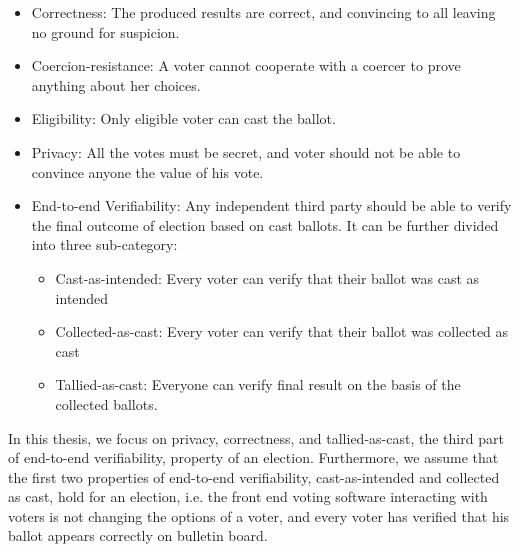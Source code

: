 %   
 \begin{itemize}
 
  \item Correctness:
 	The produced results are correct, and convincing to all leaving no  ground for suspicion. 

 \item Coercion-resistance: A voter cannot cooperate with a coercer to prove anything about her choices.
 
 \item Eligibility: Only eligible voter can cast the ballot.
 	
 \item Privacy:
    All the votes must be secret, and voter should not be able to convince anyone the 
    value of his vote.
 
 \item End-to-end Verifiability:
 Any independent third party should be able to verify the final outcome of election based on cast 
 ballots.  It can be further divided into three sub-category:
 
 \begin{itemize}
  \item Cast-as-intended: Every voter can verify that their ballot was cast as
  intended
  \item Collected-as-cast: Every voter can verify that their ballot was collected as
  cast
  \item Tallied-as-cast: Everyone can verify final result on the basis of the
  collected ballots.
\end{itemize}
\end{itemize}
	

In this thesis, we focus on privacy, correctness, and tallied-as-cast, the third part of end-to-end verifiability, property 
of an election. Furthermore, we assume that the first two properties of end-to-end verifiability, cast-as-intended and 
collected as cast, hold for an election, i.e. the front end voting software interacting with voters is not 
changing the options of a voter, and every voter has verified that his ballot appears correctly on bulletin board.

